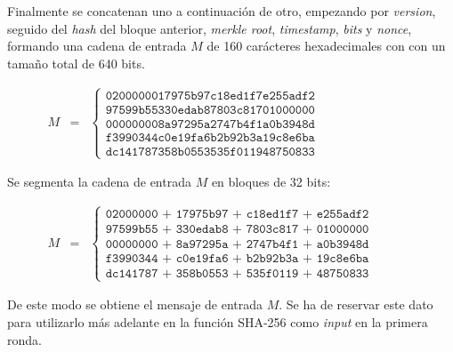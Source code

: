 \documentclass{article}
\begin{document}
    Finalmente se concatenan uno a continuación de otro, empezando por \textit{version}, seguido del \textit{hash} del bloque anterior, \textit{merkle root}, \textit{timestamp}, \textit{bits} y \textit{nonce}, formando una cadena de entrada $M$ de 160 carácteres hexadecimales con con un tamaño total de 640 bits.
    
    \begin{figure}[H]
    \centering
        $\begin{array}{rcl}
             M & = & \left \{
            \begin{array}{c}
                \texttt{0200000017975b97c18ed1f7e255adf2} \\
                \texttt{97599b55330edab87803c81701000000} \\
                \texttt{000000008a97295a2747b4f1a0b3948d} \\
                \texttt{f3990344c0e19fa6b2b92b3a19c8e6ba} \\
                \texttt{dc141787358b0553535f011948750833}
            \end{array}
            \right .
        \end{array}$
    \end{figure}
    
    Se segmenta la cadena de entrada $M$ en bloques de 32 bits:
    \begin{figure}[H]
    \centering
        $\begin{array}{rcl}
             M & = & \left \{
            \begin{array}{c}
                \texttt{02000000 + 17975b97 + c18ed1f7 + e255adf2} \\
                \texttt{97599b55 + 330edab8 + 7803c817 + 01000000} \\
                \texttt{00000000 + 8a97295a + 2747b4f1 + a0b3948d} \\
                \texttt{f3990344 + c0e19fa6 + b2b92b3a + 19c8e6ba} \\
                \texttt{dc141787 + 358b0553 + 535f0119 + 48750833}
            \end{array}
            \right .
        \end{array}$
    \end{figure}
    
    De este modo se obtiene el mensaje de entrada $M$. Se ha de reservar este dato para utilizarlo más adelante en la función SHA-256 como \textit{input} en la primera ronda.
    
\end{document}
